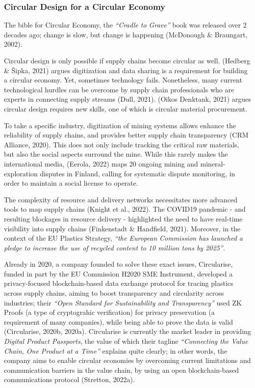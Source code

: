 \documentclass[
  12pt,
  letterpaper,
  DIV=11,
  numbers=noendperiod]{scrartcl}
\begin{document}
\subsubsection{Circular Design for a Circular
Economy}\label{circular-design-for-a-circular-economy}

The bible for Circular Economy, the \emph{``Cradle to Grave''} book was
released over 2 decades ago; change is slow, but change is happening
(McDonough \& Braungart, 2002).

Circular design is only possible if supply chains become circular as
well. (Hedberg \& Šipka, 2021) argues digitization and data sharing is a
requirement for building a circular economy. Yet, sometimes technology
fails. Nonetheless, many current technological hurdles can be overcome
by supply chain professionals who are experts in connecting supply
streams (Dull, 2021). (Oikos Denktank, 2021) argues circular design
requires new skills, one of which is circular material procurement.

To take a specific industry, digitization of mining systems allows
enhance the reliability of supply chains, and provides better supply
chain transparency (CRM Alliance, 2020). This does not only include
tracking the critical raw materials, but also the social aspects
surround the mine. While this rarely makes the international media,
(Eerola, 2022) maps 20 ongoing mining and mineral-exploration disputes
in Finland, calling for systematic dispute monitoring, in order to
maintain a social license to operate.

The complexity of resource and delivery networks necessitates more
advanced tools to map supply chains (Knight et al., 2022). The COVID19
pandemic - and resulting blockages in resource delivery - highlighted
the need to have real-time visibility into supply chains (Finkenstadt \&
Handfield, 2021). Moreover, in the context of the EU Plastics Strategy,
\emph{``the European Commission has launched a pledge to increase the
use of recycled content to 10 million tons by 2025''}.

Already in 2020, a company founded to solve these exact issues,
Circularise, funded in part by the EU Commission H2020 SME Instrument,
developed a privacy-focused blockchain-based data exchange protocol for
tracing plastics across supply chains, aiming to boost transparency and
circularity across industries; their \emph{``Open Standard for
Sustainability and Transparency''} used ZK Proofs (a type of
cryptograhic verification) for privacy preservation (a requirement of
many companies), while being able to prove the data is valid
(Circularise, 2020b, 2020a). Circularise is currently the market leader
in providing \emph{Digital Product Passports}, the value of which their
tagline \emph{``Connecting the Value Chain, One Product at a Time''}
explains quite clearly; in other words, the company aims to enable
circular economies by overcoming current limitations and communication
barriers in the value chain, by using an open blockchain-based
communications protocol (Stretton, 2022a).
\end{document}
